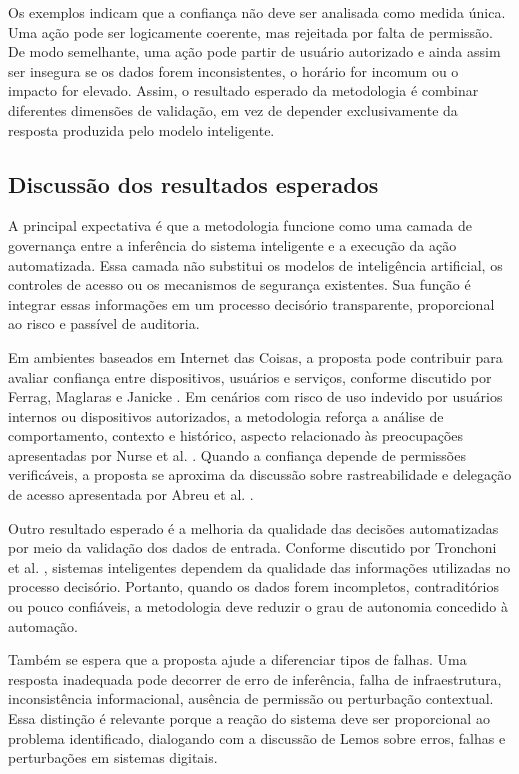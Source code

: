 \documentclass[12pt]{article}
\begin{document}
Os exemplos indicam que a confiança não deve ser analisada como medida única. Uma ação pode ser logicamente coerente, mas rejeitada por falta de permissão. De modo semelhante, uma ação pode partir de usuário autorizado e ainda assim ser insegura se os dados forem inconsistentes, o horário for incomum ou o impacto for elevado. Assim, o resultado esperado da metodologia é combinar diferentes dimensões de validação, em vez de depender exclusivamente da resposta produzida pelo modelo inteligente.

\subsection{Discussão dos resultados esperados}

A principal expectativa é que a metodologia funcione como uma camada de governança entre a inferência do sistema inteligente e a execução da ação automatizada. Essa camada não substitui os modelos de inteligência artificial, os controles de acesso ou os mecanismos de segurança existentes. Sua função é integrar essas informações em um processo decisório transparente, proporcional ao risco e passível de auditoria.

Em ambientes baseados em Internet das Coisas, a proposta pode contribuir para avaliar confiança entre dispositivos, usuários e serviços, conforme discutido por Ferrag, Maglaras e Janicke \cite{ferrag2019}. Em cenários com risco de uso indevido por usuários internos ou dispositivos autorizados, a metodologia reforça a análise de comportamento, contexto e histórico, aspecto relacionado às preocupações apresentadas por Nurse et al. \cite{nurse2015}. Quando a confiança depende de permissões verificáveis, a proposta se aproxima da discussão sobre rastreabilidade e delegação de acesso apresentada por Abreu et al. \cite{abreu2025}.

Outro resultado esperado é a melhoria da qualidade das decisões automatizadas por meio da validação dos dados de entrada. Conforme discutido por Tronchoni et al. \cite{tronchoni2010}, sistemas inteligentes dependem da qualidade das informações utilizadas no processo decisório. Portanto, quando os dados forem incompletos, contraditórios ou pouco confiáveis, a metodologia deve reduzir o grau de autonomia concedido à automação.

Também se espera que a proposta ajude a diferenciar tipos de falhas. Uma resposta inadequada pode decorrer de erro de inferência, falha de infraestrutura, inconsistência informacional, ausência de permissão ou perturbação contextual. Essa distinção é relevante porque a reação do sistema deve ser proporcional ao problema identificado, dialogando com a discussão de Lemos \cite{lemos2024} sobre erros, falhas e perturbações em sistemas digitais.
\end{document}
